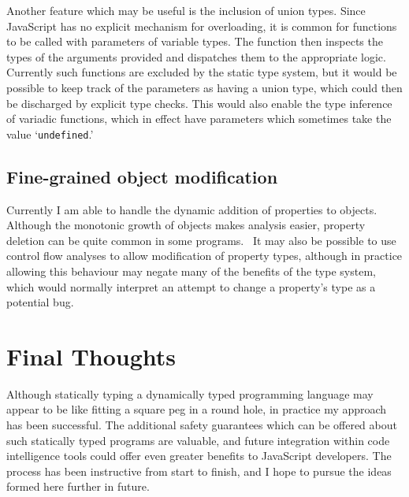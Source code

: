 \documentclass[12pt,a4paper,twoside,openright]{report}
\theoremstyle{definition}
\theoremstyle{dotless}
\newcommand*{\js}{\texttt}
\begin{document}
Another feature which may be useful is the inclusion of union types.
Since JavaScript has no explicit mechanism for overloading, it is common for
functions to be called with parameters of variable types. The function then
inspects the types of the arguments provided and dispatches them to the
appropriate logic. Currently such functions are excluded by the
static type system, but it would be possible to keep track of the parameters
as having a union type, which could then be discharged by explicit type checks.
This would also enable the type inference of variadic functions, which in effect
have parameters which sometimes take the value `\js{undefined}.'

\subsection{Fine-grained object modification}

Currently I am able to handle the dynamic addition of properties to objects. 
Although the monotonic growth of objects makes analysis easier, property deletion
can be quite common in some programs.~\cite{JSBehaviour} It may also be possible
to use control flow analyses to allow modification of property types, although
in practice allowing this behaviour may negate many of the benefits of the type system, which 
would normally interpret an attempt to change a property's type as a potential bug.

\section{Final Thoughts}

Although statically typing a dynamically typed programming language may appear
to be like fitting a square peg in a round hole, in practice my approach has
been successful. The additional safety guarantees which can be offered about
such statically typed programs are valuable, and future integration within code
intelligence tools could offer even greater benefits to JavaScript developers.
The process has been instructive from start to finish, and I hope to pursue the
ideas formed here further in future.
\end{document}
